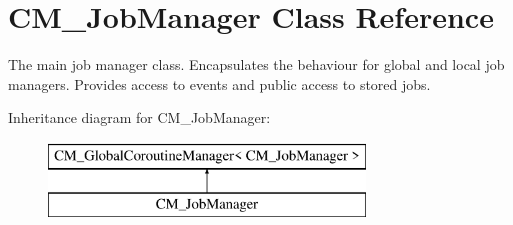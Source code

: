 \hypertarget{class_c_m___job_manager}{}\section{C\+M\+\_\+\+Job\+Manager Class Reference}
\label{class_c_m___job_manager}


The main job manager class. Encapsulates the behaviour for global and local job managers. Provides access to events and public access to stored jobs.  


Inheritance diagram for C\+M\+\_\+\+Job\+Manager\+:\begin{figure}[H]
\begin{center}
\leavevmode
\includegraphics[height=2.000000cm]{class_c_m___job_manager}
\end{center}
\end{figure}
